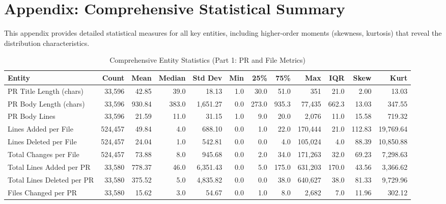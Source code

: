 \documentclass[11pt]{article}
\begin{document}
\newpage
\section*{Appendix: Comprehensive Statistical Summary}

This appendix provides detailed statistical measures for all key entities, including higher-order moments (skewness, kurtosis) that reveal the distribution characteristics.

\begin{table}[H]
\centering
\caption{Comprehensive Entity Statistics (Part 1: PR and File Metrics)}
\tiny
\begin{tabular}{@{}lrrrrrrrrrrr@{}}
\toprule
\textbf{Entity} & \textbf{Count} & \textbf{Mean} & \textbf{Median} & \textbf{Std Dev} & \textbf{Min} & \textbf{25\%} & \textbf{75\%} & \textbf{Max} & \textbf{IQR} & \textbf{Skew} & \textbf{Kurt} \\
\midrule
PR Title Length (chars) & 33,596 & 42.85 & 39.0 & 18.13 & 1.0 & 30.0 & 51.0 & 351 & 21.0 & 2.00 & 13.03 \\
PR Body Length (chars) & 33,596 & 930.84 & 383.0 & 1,651.27 & 0.0 & 273.0 & 935.3 & 77,435 & 662.3 & 13.03 & 347.55 \\
PR Body Lines & 33,596 & 21.59 & 11.0 & 31.15 & 1.0 & 9.0 & 20.0 & 2,076 & 11.0 & 15.58 & 719.32 \\
Lines Added per File & 524,457 & 49.84 & 4.0 & 688.10 & 0.0 & 1.0 & 22.0 & 170,444 & 21.0 & 112.83 & 19,769.64 \\
Lines Deleted per File & 524,457 & 24.04 & 1.0 & 542.81 & 0.0 & 0.0 & 4.0 & 105,024 & 4.0 & 88.39 & 10,850.88 \\
Total Changes per File & 524,457 & 73.88 & 8.0 & 945.68 & 0.0 & 2.0 & 34.0 & 171,263 & 32.0 & 69.23 & 7,298.63 \\
Total Lines Added per PR & 33,580 & 778.37 & 46.0 & 6,351.43 & 0.0 & 5.0 & 175.0 & 631,203 & 170.0 & 43.56 & 3,366.62 \\
Total Lines Deleted per PR & 33,580 & 375.52 & 5.0 & 4,835.82 & 0.0 & 0.0 & 38.0 & 640,627 & 38.0 & 81.33 & 9,729.96 \\
Files Changed per PR & 33,580 & 15.62 & 3.0 & 54.67 & 0.0 & 1.0 & 8.0 & 2,682 & 7.0 & 11.96 & 302.12 \\
\bottomrule
\end{tabular}
\end{table}
\end{document}
